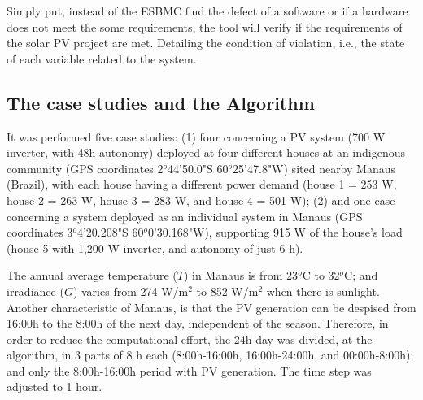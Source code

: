 \documentclass[journal]{IEEEtran}
\begin{document}
Simply put, instead of the ESBMC find the defect of a software or if a hardware does not meet the some requirements, the tool will verify if the requirements of the solar PV project are met. Detailing the condition of violation, i.e., the state of each variable related to the system. 

\subsection{The case studies and the Algorithm}
It was performed five case studies: (1) four concerning a PV system (700 W inverter, with 48h autonomy) deployed at four different houses at an indigenous community (GPS coordinates 2$^{o}$44'50.0"S 60$^{o}$25'47.8"W) sited nearby Manaus (Brazil), with each house having a different power demand (house 1 = 253 W, house 2 = 263 W, house 3 = 283 W, and house 4 = 501 W); (2) and one case concerning a system deployed as an individual system in Manaus (GPS coordinates 3$^{o}$4'20.208"S 60$^{o}$0'30.168"W), supporting 915 W of the house's load (house 5 with 1,200 W inverter, and autonomy of just 6 h). 
%
%
%

The annual average temperature ($T$) in Manaus is from 23$^{o}$C to 32$^{o}$C; and irradiance ($G$) varies from 274 W/m$^{2}$ to 852 W/m$^{2}$ when there is sunlight.  
Another characteristic of Manaus, is that the PV generation can be despised from 16:00h to the 8:00h of the next day, independent of the season.
Therefore, in order to reduce the computational effort,
the 24h-day was divided, at the algorithm, in 3 parts of 8 h each (8:00h-16:00h, 16:00h-24:00h, and 00:00h-8:00h); and only the 8:00h-16:00h period with PV generation. The time step was adjusted to 1 hour. 
\end{document}
